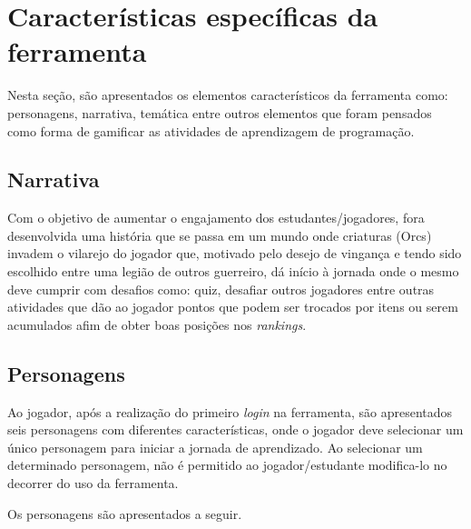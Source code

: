 \section{Características específicas da ferramenta}

Nesta seção, são apresentados os elementos característicos da ferramenta como: personagens, narrativa, temática entre outros 
elementos que foram pensados como forma de gamificar as atividades de aprendizagem de programação.

\subsection{Narrativa}

Com o objetivo de aumentar o engajamento dos estudantes/jogadores, fora desenvolvida uma história que se passa em um mundo 
onde criaturas (Orcs) invadem o vilarejo do jogador que, motivado pelo desejo de vingança e tendo sido escolhido entre uma legião 
de outros guerreiro, dá início à jornada onde o mesmo deve cumprir com desafios como: quiz, desafiar outros jogadores entre outras
atividades que dão ao jogador pontos que podem ser trocados por itens ou serem acumulados afim de obter boas posições nos \textit{rankings}.

\subsection{Personagens}

Ao jogador, após a realização do primeiro \textit{login} na ferramenta, são apresentados seis personagens com diferentes características, onde o jogador
deve selecionar um único personagem para iniciar a jornada de aprendizado. Ao selecionar um determinado personagem, não é permitido ao jogador/estudante 
modifica-lo no decorrer do uso da ferramenta.

Os personagens são apresentados a seguir.

